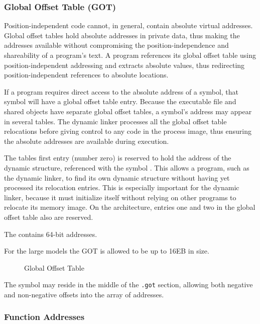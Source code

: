 \subsubsection{Global Offset Table (GOT)}

Position-independent code cannot, in general, contain absolute virtual
addresses. Global offset tables hold absolute addresses in private
data, thus making the addresses available without compromising the
position-independence and shareability of a program's text. A program
references its global offset table using position-independent
addressing and extracts absolute values, thus redirecting
position-independent references to absolute locations.
 
If a program requires direct access to the absolute address of a
symbol, that symbol will have a global offset table entry. Because
the executable file and shared objects have separate global offset
tables, a symbol's address may appear in several tables. The dynamic
linker processes all the global offset table relocations before giving
control to any code in the process image, thus ensuring the absolute
addresses are available during execution.

The tables first entry (number zero) is reserved to hold the address
of the dynamic
structure, referenced with the symbol . This allows a
program, such as the dynamic linker, to find its own dynamic structure
without having yet processed its relocation entries. This is
especially important for the dynamic linker, because it must
initialize itself without relying on other programs to relocate its
memory image. On the \xARCH architecture, entries one and two in the
global offset table also are reserved. 

The  contains 64-bit addresses.

For the large models the GOT is allowed to be up to 16EB in size.

\begin{figure}[H]
\Hrule
\caption{Global Offset Table}
\begin{center}
\end{center}
\Hrule
\end{figure}

The symbol  may reside in the
middle of the {\tt .got} section, allowing both negative and
non-negative offsets into the array of addresses.

\subsubsection{Function Addresses}
\label{function_addresses}

